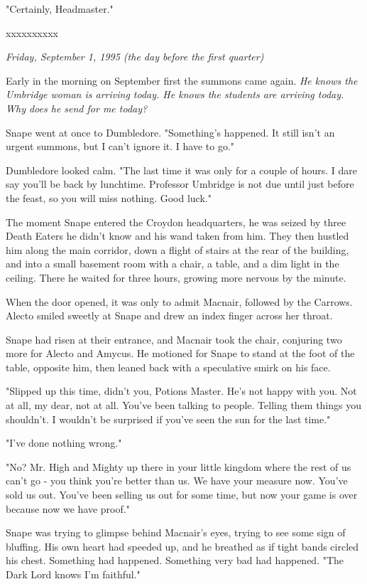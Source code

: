 \documentclass[a4paper,11pt]{article}
\begin{document}
"Certainly, Headmaster."

xxxxxxxxxx

\emph{Friday, September 1, 1995 (the day before the first quarter)}

Early in the morning on September first the summons came again. \emph{He knows the Umbridge woman is arriving today. He knows the students are arriving today. Why does he send for me today?}

Snape went at once to Dumbledore. "Something's happened. It still isn't an urgent summons, but I can't ignore it. I have to go."

Dumbledore looked calm. "The last time it was only for a couple of hours. I dare say you'll be back by lunchtime. Professor Umbridge is not due until just before the feast, so you will miss nothing. Good luck."

The moment Snape entered the Croydon headquarters, he was seized by three Death Eaters he didn't know and his wand taken from him. They then hustled him along the main corridor, down a flight of stairs at the rear of the building, and into a small basement room with a chair, a table, and a dim light in the ceiling. There he waited for three hours, growing more nervous by the minute.

When the door opened, it was only to admit Macnair, followed by the Carrows. Alecto smiled sweetly at Snape and drew an index finger across her throat.

Snape had risen at their entrance, and Macnair took the chair, conjuring two more for Alecto and Amycus. He motioned for Snape to stand at the foot of the table, opposite him, then leaned back with a speculative smirk on his face.

"Slipped up this time, didn't you, Potions Master. He's not happy with you. Not at all, my dear, not at all. You've been talking to people. Telling them things you shouldn't. I wouldn't be surprised if you've seen the sun for the last time."

"I've done nothing wrong."

"No? Mr. High and Mighty up there in your little kingdom where the rest of us can't go - you think you're better than us. We have your measure now. You've sold us out. You've been selling us out for some time, but now your game is over because now we have proof."

Snape was trying to glimpse behind Macnair's eyes, trying to see some sign of bluffing. His own heart had speeded up, and he breathed as if tight bands circled his chest. Something had happened. Something very bad had happened. "The Dark Lord knows I'm faithful."
\end{document}

